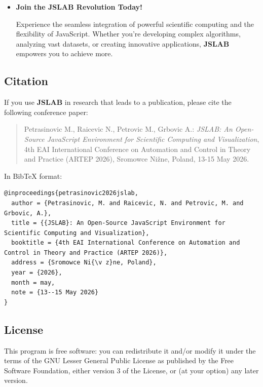 \documentclass[12pt,a4paper]{article}
\begin{document}
\begin{itemize}
Connect AI agents to the live JSLAB workspace through MCP. Agents can run calculations and scripts, inspect variables, check code, run test scripts and review plots while you follow their work in the desktop. See the MCP server section for setup and available tools.

\item \textbf{Join the JSLAB Revolution Today!}

Experience the seamless integration of powerful scientific computing and the flexibility of JavaScript. Whether you're developing complex algorithms, analyzing vast datasets, or creating innovative applications, \textbf{JSLAB} empowers you to achieve more.

\end{itemize}

\subsection{Citation}

If you use \textbf{JSLAB} in research that leads to a publication, please cite the following conference paper:

\begin{quote}
Petrasinovic M., Raicevic N., Petrovic M., Grbovic A.: \textit{JSLAB: An Open-Source JavaScript Environment for Scientific Computing and Visualization}, 4th EAI International Conference on Automation and Control in Theory and Practice (ARTEP 2026), Sromowce Ni{\v z}ne, Poland, 13-15 May 2026.
\end{quote}

In BibTeX format:

\begin{verbatim}
@inproceedings{petrasinovic2026jslab,
  author = {Petrasinovic, M. and Raicevic, N. and Petrovic, M. and Grbovic, A.},
  title = {{JSLAB}: An Open-Source JavaScript Environment for Scientific Computing and Visualization},
  booktitle = {4th EAI International Conference on Automation and Control in Theory and Practice (ARTEP 2026)},
  address = {Sromowce Ni{\v z}ne, Poland},
  year = {2026},
  month = may,
  note = {13--15 May 2026}
}
\end{verbatim}

\subsection{License}
This program is free software: you can redistribute it and/or modify it under the terms of the GNU Lesser General Public License as published by the Free Software Foundation, either version 3 of the License, or (at your option) any later version.
\end{document}
